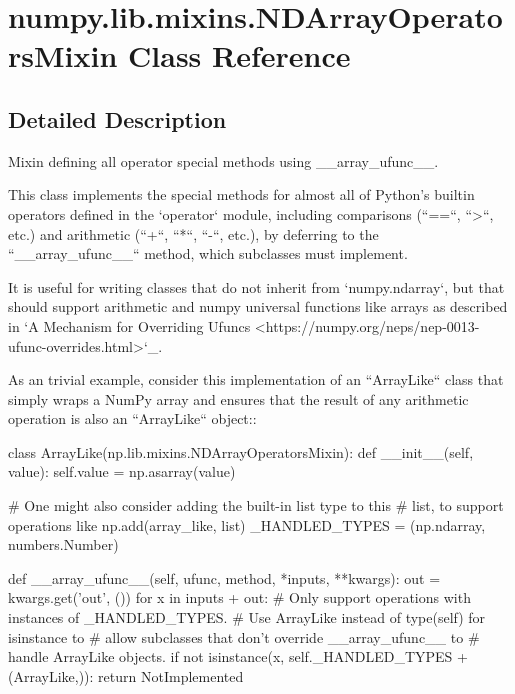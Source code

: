 \hypertarget{classnumpy_1_1lib_1_1mixins_1_1NDArrayOperatorsMixin}{}\section{numpy.\+lib.\+mixins.\+N\+D\+Array\+Operators\+Mixin Class Reference}
\label{classnumpy_1_1lib_1_1mixins_1_1NDArrayOperatorsMixin}


\subsection{Detailed Description}
\begin{DoxyVerb}Mixin defining all operator special methods using __array_ufunc__.

This class implements the special methods for almost all of Python's
builtin operators defined in the `operator` module, including comparisons
(``==``, ``>``, etc.) and arithmetic (``+``, ``*``, ``-``, etc.), by
deferring to the ``__array_ufunc__`` method, which subclasses must
implement.

It is useful for writing classes that do not inherit from `numpy.ndarray`,
but that should support arithmetic and numpy universal functions like
arrays as described in `A Mechanism for Overriding Ufuncs
<https://numpy.org/neps/nep-0013-ufunc-overrides.html>`_.

As an trivial example, consider this implementation of an ``ArrayLike``
class that simply wraps a NumPy array and ensures that the result of any
arithmetic operation is also an ``ArrayLike`` object::

    class ArrayLike(np.lib.mixins.NDArrayOperatorsMixin):
        def __init__(self, value):
            self.value = np.asarray(value)

        # One might also consider adding the built-in list type to this
        # list, to support operations like np.add(array_like, list)
        _HANDLED_TYPES = (np.ndarray, numbers.Number)

        def __array_ufunc__(self, ufunc, method, *inputs, **kwargs):
            out = kwargs.get('out', ())
            for x in inputs + out:
                # Only support operations with instances of _HANDLED_TYPES.
                # Use ArrayLike instead of type(self) for isinstance to
                # allow subclasses that don't override __array_ufunc__ to
                # handle ArrayLike objects.
                if not isinstance(x, self._HANDLED_TYPES + (ArrayLike,)):
                    return NotImplemented


\end{DoxyVerb}
